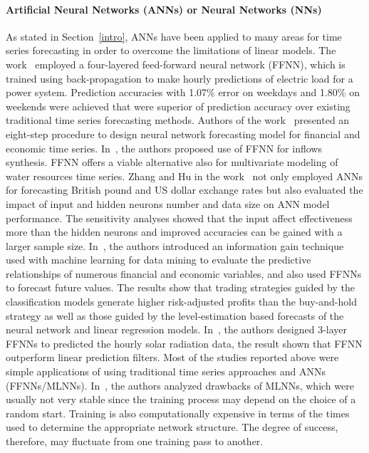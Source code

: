 \documentclass[review,3p,authoryear]{elsarticle}
\begin{document}
\paragraph{Artificial Neural Networks (ANNs) or Neural Networks (NNs)} 
As stated in Section~\ref{intro}, ANNs have been applied to many areas for time series forecasting in order to overcome the limitations of linear models. 
The work~\citep{ref_srinivasan} employed a four-layered feed-forward neural network (FFNN), which is trained using back-propagation to make hourly predictions of electric load for a power system. Prediction accuracies with 1.07\% error on weekdays and 1.80\% on weekends were achieved that were superior of prediction accuracy over existing traditional time series forecasting methods. 
Authors of the work~\citep{ref_kaastra} presented an eight-step procedure to design neural network forecasting model for financial and economic time series. 
In~\citep{ref_raman}, the authors proposed use of FFNN for inflows synthesis.
FFNN offers a viable alternative also for multivariate modeling of water resources time series. Zhang and Hu in the work~\citep{ref_zhang} not only employed ANNs for forecasting British pound and US dollar exchange rates but also evaluated the impact of input and hidden neurons number and data size on ANN model performance. The sensitivity analyses showed that the input affect effectiveness more than the hidden neurons and improved accuracies can be gained with a larger sample size. In~\citep{ref_enke}, the authors introduced an information gain technique used with machine learning for data mining to evaluate the predictive relationships of numerous financial and economic variables, and also used FFNNs to forecast future values. The results show that trading strategies guided by the classification models generate higher risk-adjusted profits than the buy-and-hold strategy as well as those guided by the level-estimation based forecasts of the neural network and linear regression models. In~\citep{ref_hocaoglu}, the authors designed 3-layer FFNNs to predicted the hourly solar radiation data, the result shown that FFNN outperform linear prediction filters. Most of the studies reported above were simple applications of using traditional time series approaches and ANNs (FFNNs/MLNNs). In~\citep{ref_enke}, the authors analyzed drawbacks of MLNNs, which were usually not very stable since the training process may depend on the choice of a random start. Training is also computationally expensive in terms of the times used to determine the appropriate network structure. The degree of success, therefore, may fluctuate from one training pass to another.
\end{document}
